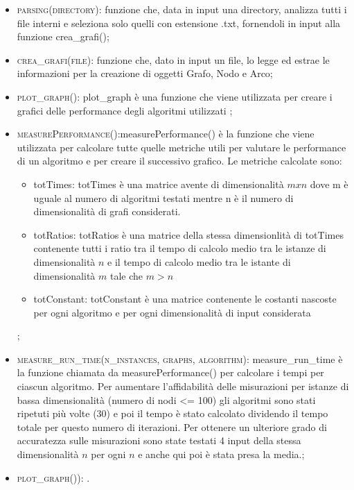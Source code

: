 \begin{itemize}
    \item \textsc{parsing(directory)}: funzione che, data in input una directory, analizza tutti i file interni e seleziona solo quelli con estensione .txt, fornendoli in input alla funzione crea\_grafi();
    \item \textsc{crea\_grafi(file)}: funzione che, dato in input un file, lo legge ed estrae le informazioni per la creazione di oggetti Grafo, Nodo e Arco;
    \item \textsc{plot\_graph()}: plot\_graph è una funzione che viene utilizzata per creare i grafici delle performance degli algoritmi utilizzati ;
    
    \item \textsc{measurePerformance()}:measurePerformance() è la funzione che viene utilizzata per calcolare tutte quelle metriche utili per valutare le performance di un algoritmo e per creare il successivo grafico. Le metriche calcolate sono:
    \begin{itemize}
        \item  totTimes:  totTimes è una matrice avente di dimensionalità $mxn$ dove m è uguale al numero di algoritmi testati mentre n è il numero di dimensionalità di grafi considerati.
        \item totRatios: totRatios è una matrice della stessa dimensionlità di totTimes contenente tutti i ratio tra il tempo di calcolo medio tra le istanze di dimensionalità $n$ e il tempo di calcolo medio tra le istante di dimensionalità $m$ tale che $m>n$
        \item  totConstant:  totConstant è una matrice contenente le costanti nascoste per ogni algoritmo e per ogni dimensionalità di input considerata
    \end{itemize};
    \item \textsc{measure\_run\_time(n\_instances, graphs, algorithm)}: measure\_run\_time è la funzione chiamata da  measurePerformance() per calcolare i tempi per ciascun algoritmo. Per aumentare l'affidabilità delle misurazioni per istanze di bassa dimensionalità (numero di nodi <= 100) gli algoritmi sono stati ripetuti più volte (30) e poi il tempo è stato calcolato dividendo il tempo totale per questo numero di iterazioni. Per ottenere un ulteriore grado di accuratezza sulle misurazioni sono state testati 4 input della stessa dimensionalità $n$ per ogni $n$ e anche qui poi è stata presa la media.;
    
    \item \textsc{plot\_graph())}: .
\end{itemize}


\newpage